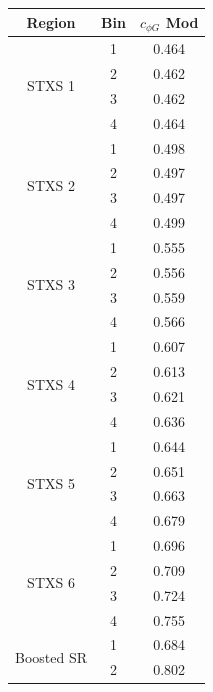 
\begin{tabular}{|c|c|c|}
\hline
\textbf{Region} & \textbf{Bin} & \textbf{$c_{\phi G}$ Mod} \\
\hline
\multirow{4}{*}{STXS 1} & 1 & 0.464 \\
                          & 2 & 0.462 \\
                          & 3 & 0.462 \\
                          & 4 & 0.464\\
\hline
\multirow{4}{*}{STXS 2} & 1 &0.498 \\
                          & 2 &0.497\\
                          & 3 & 0.497\\
                          & 4 &0.499 \\
\hline
\multirow{4}{*}{STXS 3} & 1 & 0.555 \\
                          & 2 & 0.556 \\
                          & 3 & 0.559\\
                          & 4 & 0.566 \\
\hline
\multirow{4}{*}{STXS 4} & 1 & 0.607\\
                          & 2 & 0.613 \\
                          & 3 & 0.621 \\
                          & 4 & 0.636\\
\hline
\multirow{4}{*}{STXS 5} & 1 & 0.644 \\
                          & 2 & 0.651 \\
                          & 3 & 0.663 \\
                          & 4 & 0.679 \\
\hline
\multirow{4}{*}{STXS 6} & 1 & 0.696 \\
                          & 2 & 0.709 \\
                          & 3 & 0.724 \\
                          & 4 & 0.755\\
\hline
\multirow{2}{*}{Boosted SR} & 1 & 0.684\\
                          & 2 & 0.802 \\
\hline
\end{tabular}

